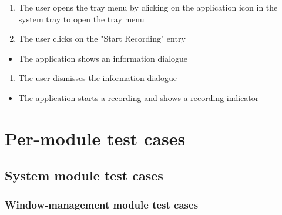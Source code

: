 \begin{tests}
    {\begin{enumerate}
        \item The \gls{user} opens the tray menu by clicking on the application icon in the system tray to open the tray menu
        \item The \gls{user} clicks on the "Start Recording" entry
    \end{enumerate}}
    {\begin{itemize}
        \item The application shows an information dialogue
    \end{itemize}}
    
    {\begin{enumerate}
        \item The user dismisses the information dialogue
    \end{enumerate}}
    {\begin{itemize}
        \item The application starts a recording and shows a recording indicator
    \end{itemize}}
    
\end{tests}

\section{Per-module test cases}

\subsection{System module test cases}

\subsubsection{Window-management module test cases}

